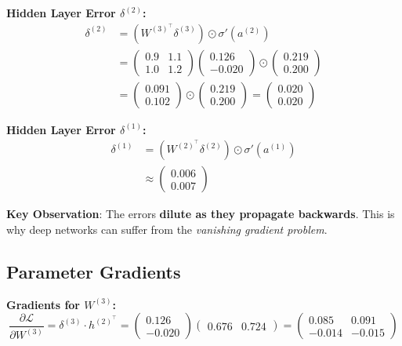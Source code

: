 \textbf{Hidden Layer Error $\delta^{(2)}$:}
\begin{align}
\delta^{(2)} &= \left( W^{(3)^\top} \delta^{(3)} \right) \odot \sigma'(a^{(2)}) \\
&= \begin{pmatrix} 0.9 & 1.1 \\ 1.0 & 1.2 \end{pmatrix} \begin{pmatrix} 0.126 \\ -0.020 \end{pmatrix} \odot \begin{pmatrix} 0.219 \\ 0.200 \end{pmatrix} \\
&= \begin{pmatrix} 0.091 \\ 0.102 \end{pmatrix} \odot \begin{pmatrix} 0.219 \\ 0.200 \end{pmatrix} = \begin{pmatrix} 0.020 \\ 0.020 \end{pmatrix}
\end{align}

\textbf{Hidden Layer Error $\delta^{(1)}$:}
\begin{align}
\delta^{(1)} &= \left( W^{(2)^\top} \delta^{(2)} \right) \odot \sigma'(a^{(1)}) \\
&\approx \begin{pmatrix} 0.006 \\ 0.007 \end{pmatrix}
\end{align}

\textbf{Key Observation}: The errors \textbf{dilute as they propagate backwards}. This is why deep networks can suffer from the \emph{vanishing gradient problem}.

\subsection{Parameter Gradients}

\textbf{Gradients for $W^{(3)}$:}
\[
\frac{\partial \mathcal{L}}{\partial W^{(3)}} = \delta^{(3)} \cdot h^{(2)^\top} = \begin{pmatrix} 0.126 \\ -0.020 \end{pmatrix} \begin{pmatrix} 0.676 & 0.724 \end{pmatrix} = \begin{pmatrix} 0.085 & 0.091 \\ -0.014 & -0.015 \end{pmatrix}
\]

